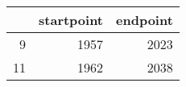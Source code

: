 % 
\begin{tabular}{rrr}
  \hline
 & startpoint & endpoint \\ 
  \hline
9 & 1957 & 2023 \\ 
  11 & 1962 & 2038 \\ 
   \hline
\end{tabular}
